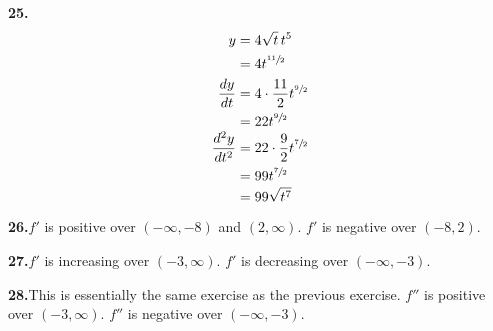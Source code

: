 \documentclass[10pt,oneside,]{book}
\theoremstyle{plain}
\theoremstyle{definition}
\numberwithin{equation}{section}
\newcommand{\ointerval}[2]{\left(#1,#2\right)}
\newcommand{\fd}[1]{#1'}
\newcommand{\sd}[1]{#1''}
\newcommand{\lz}[2]{\frac{d#1}{d#2}}
\newcommand{\lzn}[3]{\frac{d^{#1}#2}{d#3^{#1}}}
\begin{document}
\par\smallskip
\noindent\textbf{25.}\quad{}\begin{align*}
y&=4\sqrt{t}\,t^5\\
&=4t^{\sfrac{11}{2}}\\
\lz{y}{t}&=4\cdot\frac{11}{2}t^{\sfrac{9}{2}}\\
&=22t^{\sfrac{9}{2}}\\
\lzn{2}{y}{t}&=22\cdot\frac{9}{2}t^{\sfrac{7}{2}}\\
&=99t^{\sfrac{7}{2}}\\
&=99\sqrt{t^7}
\end{align*}%
\par\smallskip
\noindent\textbf{26.}\quad{}\(\fd{f}\) is positive over \(\ointerval{-\infty}{-8}\) and \(\ointerval{2}{\infty}\). \(\fd{f}\) is negative over \(\ointerval{-8}{2}\).%
\par\smallskip
\noindent\textbf{27.}\quad{}\(\fd{f}\) is increasing over \(\ointerval{-3}{\infty}\). \(\fd{f}\) is decreasing over \(\ointerval{-\infty}{-3}\).%
\par\smallskip
\noindent\textbf{28.}\quad{}This is essentially the same exercise as the previous exercise. \(\sd{f}\) is positive over \(\ointerval{-3}{\infty}\). \(\sd{f}\) is negative over \(\ointerval{-\infty}{-3}\).%
\par\smallskip
\end{document}
